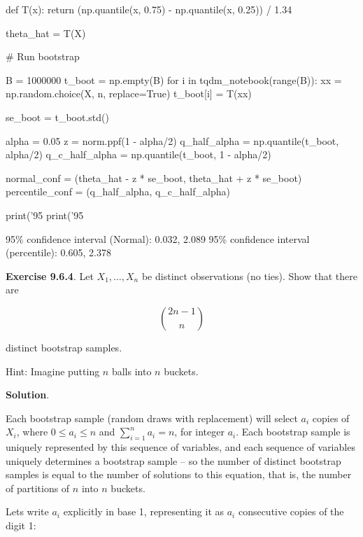 \begin{python}
def T(x):
    return (np.quantile(x, 0.75) - np.quantile(x, 0.25)) / 1.34
\end{python}

\begin{python}
theta_hat = T(X)
\end{python}

\begin{python}
# Run bootstrap

B = 1000000
t_boot = np.empty(B)
for i in tqdm_{n}otebook(range(B)):
    xx = np.random.choice(X, n, replace=True)
    t_boot[i] = T(xx)
    
se_boot = t_boot.std()

alpha = 0.05
z = norm.ppf(1 - alpha/2)
q_half_alpha = np.quantile(t_boot, alpha/2)
q_c_half_alpha = np.quantile(t_boot, 1 - alpha/2)

normal_conf = (theta_hat - z * se_boot, theta_hat + z * se_boot)
percentile_conf = (q_half_alpha, q_c_half_alpha)

print('95%
print('95%
\end{python}


\begin{console}
95\% confidence interval (Normal):        0.032, 2.089
95\% confidence interval (percentile):    0.605, 2.378
\end{console}

\textbf{Exercise 9.6.4}. Let \(X_{1}, \dots, X_{n}\) be distinct
observations (no ties). Show that there are

\[ \binom{2n - 1}{n}\]

distinct bootstrap samples.

Hint: Imagine putting \(n\) balls into \(n\) buckets.

\textbf{Solution}.

Each bootstrap sample (random draws with replacement) will select
\(a_{i}\) copies of \(X_{i}\), where \(0 \leq a_{i} \leq n\) and
\(\sum_{i=1}^{n} a_{i} = n\), for integer \(a_{i}\). Each bootstrap sample is
uniquely represented by this sequence of variables, and each sequence of
variables uniquely determines a bootstrap sample -- so the number of
distinct bootstrap samples is equal to the number of solutions to this
equation, that is, the number of partitions of \(n\) into \(n\) buckets.

Lets write \(a_{i}\) explicitly in base 1, representing it as \(a_{i}\)
consecutive copies of the digit 1:

